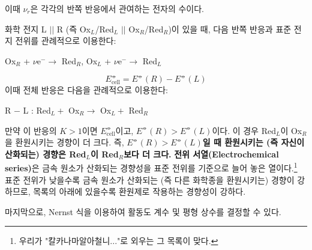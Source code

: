         이때 $\nu_r$은 각각의 반쪽 반응에서 관여하는 전자의 수이다.
        \par 화학 전지 L $\vert\vert$ R (즉 Ox$_L$/Red$_L$ $\vert\vert$ Ox$_R$/Red$_R$)이 있을 때, 다음 반쪽 반응과 표준 전지 전위를 관례적으로 이용한다:
        \begin{center}
            Ox$_R$ + $\nu$e$^- \rightarrow$ Red$_R$, Ox$_L$ + $\nu$e$^- \rightarrow$ Red$_L$
        \end{center}
        \begin{equation*}
            E_\text{cell}^\circlehbar = E^\circlehbar\left(R\right)-E^\circlehbar\left(L\right)
        \end{equation*}
        이때 전체 반응은 다음을 관례적으로 이용한다:
        \begin{center}
            R $-$ L : Red$_L+$ Ox$_R \rightarrow$ Ox$_L+$ Red$_R$
        \end{center}
        만약 이 반응의 $K>1$이면 $E_\text{cell}^\circlehbar$이고, $E^\circlehbar\left(R\right)>E^\circlehbar\left(L\right)$이다. 이 경우 Red$_L$이 Ox$_R$을 환원시키는 경향이 더 크다. 즉, 
        \textbf{$E^\circlehbar\left(R\right)>E^\circlehbar\left(L\right)$일 때 환원시키는 (즉 자신이 산화되는) 경향은 Red$_L$이 Red$_R$보다 더 크다.}
        \textbf{전위 서열(Electrochemical series)}은 금속 원소가 산화되는 경향성을 표준 전위를 기준으로 
        늘어 놓은 열이다.\footnote[17]{우리가 "칼카나마알아철니..."로 외우는 그 목록이 맞다.} 표준 전위가 낮을수록 금속 원소가 산화되는 (즉 다른 화학종을 환원시키는) 경향이 강하므로, 목록의 아래에 있을수록 환원제로 작용하는 경향성이 강하다.
        \par 마지막으로, Nernst 식을 이용하여 활동도 계수 및 평형 상수를 결정할 수 있다.